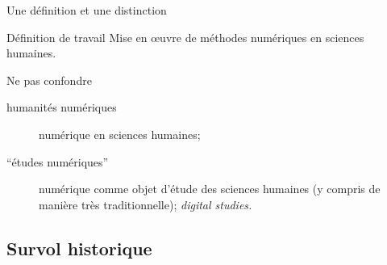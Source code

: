 \documentclass[ignorenonframetext]{beamer}
\begin{document}
\begin{frame}{Une définition et une distinction}
	
	\begin{block}{Définition de travail}
		Mise en œuvre de méthodes numériques en sciences humaines.
	\end{block}
	
	\begin{block}{Ne pas confondre}
		\begin{description}
			\item[humanités numériques] numérique \alert{en} sciences humaines;
			\item[``études numériques''] numérique comme \alert{objet d'étude} des sciences humaines (y compris de manière très traditionnelle); \textit{digital studies.}
		\end{description}
	\end{block}
	
\end{frame}

\subsection{Survol historique}
\end{document}
